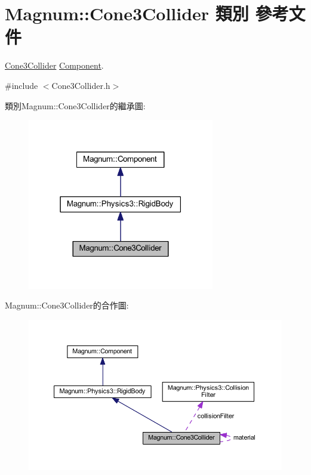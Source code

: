 \hypertarget{class_magnum_1_1_cone3_collider}{}\section{Magnum\+:\+:Cone3\+Collider 類別 參考文件}
\label{class_magnum_1_1_cone3_collider}


\hyperlink{class_magnum_1_1_cone3_collider}{Cone3\+Collider} \hyperlink{class_magnum_1_1_component}{Component}.  




{\ttfamily \#include $<$Cone3\+Collider.\+h$>$}



類別\+Magnum\+:\+:Cone3\+Collider的繼承圖\+:\nopagebreak
\begin{figure}[H]
\begin{center}
\leavevmode
\includegraphics[width=231pt]{class_magnum_1_1_cone3_collider__inherit__graph}
\end{center}
\end{figure}


Magnum\+:\+:Cone3\+Collider的合作圖\+:\nopagebreak
\begin{figure}[H]
\begin{center}
\leavevmode
\includegraphics[width=350pt]{class_magnum_1_1_cone3_collider__coll__graph}
\end{center}
\end{figure}
